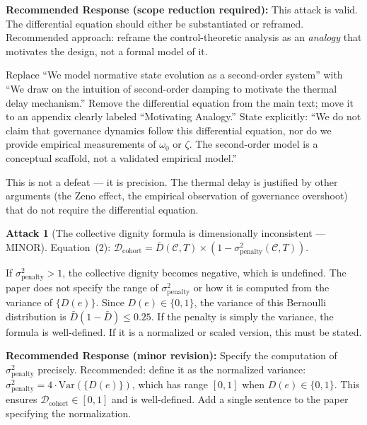 \documentclass[12pt,a4paper]{article}
\theoremstyle{definition}
\newtheorem{attack}{Attack}[section]
\begin{document}
\begin{mdframed}[style=defenseframe]
\textbf{Recommended Response (scope reduction required):}
This attack is valid. The differential equation should either be substantiated
or reframed. Recommended approach: reframe the control-theoretic analysis as
an \emph{analogy} that motivates the design, not a formal model of it.

Replace ``We model normative state evolution as a second-order system'' with
``We draw on the intuition of second-order damping to motivate the thermal delay
mechanism.'' Remove the differential equation from the main text; move it to an
appendix clearly labeled ``Motivating Analogy.'' State explicitly: ``We do not
claim that governance dynamics follow this differential equation, nor do we
provide empirical measurements of $\omega_0$ or $\zeta$. The second-order model
is a conceptual scaffold, not a validated empirical model.''

This is not a defeat — it is precision. The thermal delay is justified by
other arguments (the Zeno effect, the empirical observation of governance overshoot)
that do not require the differential equation.
\end{mdframed}

\begin{attack}[The collective dignity formula is dimensionally inconsistent — MINOR]
\label{att:collective}
Equation~(2): $\mathcal{D}_\text{cohort} = \bar{D}(\mathcal{C},T) \times
(1 - \sigma^2_\text{penalty}(\mathcal{C},T))$.

If $\sigma^2_\text{penalty} > 1$, the collective dignity becomes negative, which
is undefined. The paper does not specify the range of $\sigma^2_\text{penalty}$
or how it is computed from the variance of $\{D(e)\}$. Since $D(e) \in \{0,1\}$,
the variance of this Bernoulli distribution is $\bar{D}(1-\bar{D}) \leq 0.25$.
If the penalty is simply the variance, the formula is well-defined. If it is a
normalized or scaled version, this must be stated.
\end{attack}

\begin{mdframed}[style=defenseframe]
\textbf{Recommended Response (minor revision):}
Specify the computation of $\sigma^2_\text{penalty}$ precisely. Recommended:
define it as the normalized variance: $\sigma^2_\text{penalty} = 4 \cdot
\text{Var}(\{D(e)\})$, which has range $[0,1]$ when $D(e) \in \{0,1\}$.
This ensures $\mathcal{D}_\text{cohort} \in [0,1]$ and is well-defined.
Add a single sentence to the paper specifying the normalization.
\end{mdframed}
\end{document}
